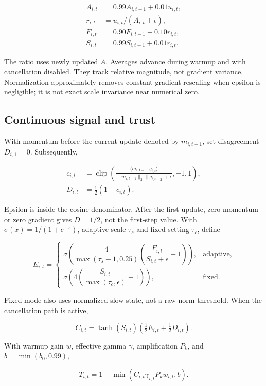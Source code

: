 \documentclass[11pt,a4paper]{article}
\theoremstyle{definition}
\theoremstyle{remark}
\begin{document}
\[
\begin{aligned}
A_{i,t}&=0.99A_{i,t-1}+0.01u_{i,t},\\
r_{i,t}&=u_{i,t}/(A_{i,t}+\epsilon),\\
F_{i,t}&=0.90F_{i,t-1}+0.10r_{i,t},\\
S_{i,t}&=0.99S_{i,t-1}+0.01r_{i,t}.
\end{aligned}
\]

The ratio uses newly updated $A$. Averages advance during warmup and with cancellation disabled. They track relative magnitude, not gradient variance. Normalization approximately removes constant gradient rescaling when epsilon is negligible; it is not exact scale invariance near numerical zero.

\subsection{Continuous signal and trust}

With momentum before the current update denoted by $m_{i,t-1}$, set disagreement $D_{i,1}=0$. Subsequently,

\[
\begin{aligned}
c_{i,t}&=\operatorname{clip}\left(\frac{\langle m_{i,t-1},g_{i,t}\rangle}{\|m_{i,t-1}\|_2\|g_{i,t}\|_2+\epsilon},-1,1\right),\\
D_{i,t}&=\tfrac12(1-c_{i,t}).
\end{aligned}
\]

Epsilon is inside the cosine denominator. After the first update, zero momentum or zero gradient gives $D=1/2$, not the first-step value. With $\sigma(x)=1/(1+e^{-x})$, adaptive scale $\tau_s$ and fixed setting $\tau_c$, define

\[
E_{i,t}=\begin{cases}
\sigma\left(\dfrac{4}{\max(\tau_s-1,0.25)}\left(\dfrac{F_{i,t}}{S_{i,t}+\epsilon}-1\right)\right),&\text{adaptive},\\
\sigma\left(4\left(\dfrac{S_{i,t}}{\max(\tau_c,\epsilon)}-1\right)\right),&\text{fixed}.
\end{cases}
\]

Fixed mode also uses normalized slow state, not a raw-norm threshold. When the cancellation path is active,

\[
C_{i,t}=\tanh(S_{i,t})\left(\tfrac12 E_{i,t}+\tfrac12 D_{i,t}\right).
\]

With warmup gain $w$, effective gamma $\gamma$, amplification $P_k$, and $b=\min(b_0,0.99)$,

\[
T_{i,t}=1-\min(C_{i,t}\gamma_{i,t}P_k w_{i,t},b).
\]
\end{document}
